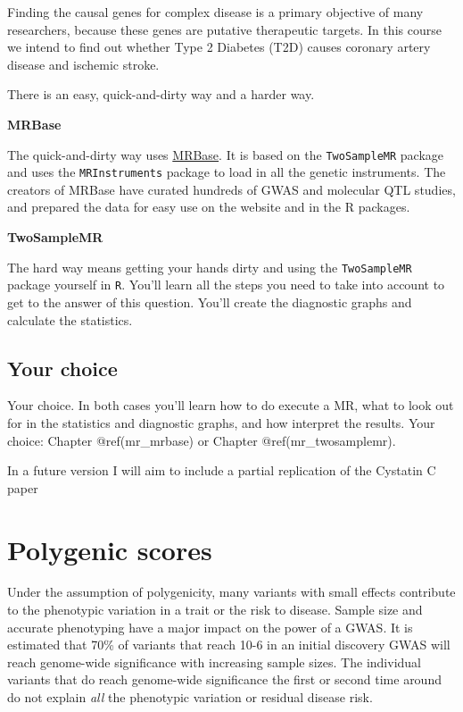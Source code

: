 \documentclass[
]{book}
\begin{document}
Finding the causal genes for complex disease is a primary objective of many researchers, because these genes are putative therapeutic targets. In this course we intend to find out whether Type 2 Diabetes (T2D) causes coronary artery disease and ischemic stroke.

There is an easy, quick-and-dirty way and a harder way.

\textbf{MRBase}

The quick-and-dirty way uses \href{http://www.mrbase.org/}{MRBase}. It is based on the \texttt{TwoSampleMR} package and uses the \texttt{MRInstruments} package to load in all the genetic instruments. The creators of MRBase have curated hundreds of GWAS and molecular QTL studies, and prepared the data for easy use on the website and in the R packages.

\textbf{TwoSampleMR}

The hard way means getting your hands dirty and using the \texttt{TwoSampleMR} package yourself in \texttt{R}. You'll learn all the steps you need to take into account to get to the answer of this question. You'll create the diagnostic graphs and calculate the statistics.

\hypertarget{your-choice}{%
\subsection{Your choice}\label{your-choice}}

Your choice. In both cases you'll learn how to do execute a MR, what to look out for in the statistics and diagnostic graphs, and how interpret the results. Your choice: Chapter @ref(mr\_mrbase) or Chapter @ref(mr\_twosamplemr).

In a future version I will aim to include a partial replication of the Cystatin C paper\citep{vanderlaan2016}

\hypertarget{polygenic-scores}{%
\section{Polygenic scores}\label{polygenic-scores}}

Under the assumption of polygenicity, many variants with small effects contribute to the phenotypic variation in a trait or the risk to disease. Sample size and accurate phenotyping have a major impact on the power of a GWAS. It is estimated that 70\% of variants that reach 10-6 in an initial discovery GWAS will reach genome-wide significance with increasing sample sizes. The individual variants that do reach genome-wide significance the first or second time around do not explain \emph{all} the phenotypic variation or residual disease risk.
\end{document}

